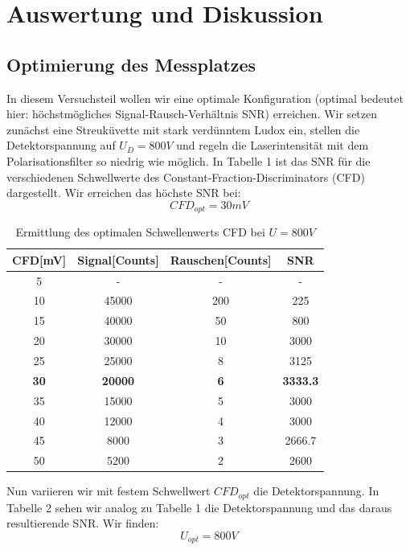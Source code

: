 \documentclass{article}
\begin{document}
\section{Auswertung und Diskussion}
\subsection{Optimierung des Messplatzes}
In diesem Versuchsteil wollen wir eine optimale Konfiguration (optimal bedeutet hier: höchstmögliches
Signal-Rausch-Verhältnis SNR) erreichen. Wir setzen zunächst eine Streuküvette mit stark verdünntem
Ludox ein, stellen die Detektorspannung auf $U_D=800V$ und regeln die Laserintensität mit dem Polarisationsfilter so niedrig
wie möglich. In Tabelle 1 ist das SNR für die verschiedenen Schwellwerte des Constant-Fraction-Discriminators (CFD) dargestellt.
Wir erreichen das höchste SNR bei: $$CFD_{opt}=30mV$$

\begin{table}[h]
  \centering
  \begin{tabular}{c|c|c|c}
    CFD[mV] & Signal[Counts] & Rauschen[Counts] & SNR \\
    \hline
    5       &     -          & -                & -\\
    10      & 45000          & 200              & 225\\
    15      & 40000          & 50               & 800\\
    20      & 30000          & 10               & 3000\\
    25      & 25000          & 8                & 3125\\
    \textbf{30}      & \textbf{20000}          & \textbf{6}                & \textbf{3333.3}\\
    35      & 15000          & 5                & 3000\\
    40      & 12000          & 4                & 3000\\
    45      & 8000           & 3                & 2666.7\\
    50      & 5200           & 2                & 2600\\
  \end{tabular}
  \caption{Ermittlung des optimalen Schwellenwerts CFD bei $U=800V$}
\end{table}

Nun variieren wir mit festem Schwellwert $CFD_{opt}$ die Detektorspannung. In Tabelle 2 sehen wir analog zu
Tabelle 1 die Detektorspannung und das daraus resultierende SNR. Wir finden: $$ U_{opt}=800V$$
\end{document}
